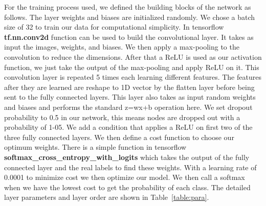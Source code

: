 \documentclass[12pt, a4paper,oneside]{report}
\begin{document}
For the training process used, we defined the building blocks of the network as follows. The layer weights and biases are initialized randomly. We chose a batch size of 32 to train our data for computational simplicity. In tensorflow \textbf{tf.nn.conv2d} function can be used to build the convolutional layer. It takes as input the images, weights, and biases. We then apply a max-pooling to the convolution to reduce the dimensions. After that a ReLU is used as our activation function, we just take the output of the max-pooling and apply ReLU on it. This convolution layer is repeated 5 times each learning different features. The features after they are learned are reshape to 1D vector by the flatten layer before being sent to the fully connected layers. This layer also takes as input random weights and biases and performs the standard z=wx+b operation here. We set dropout probability to 0.5 in our network, this means nodes are dropped out with a probability of 1-05. We add a condition that applies a ReLU on first two of the three fully connected layers. We then define a cost function to choose our optimum weights. There is a simple function in tensorflow \textbf{softmax\_cross\_entropy\_with\_logits} which takes the output of the fully connected layer and the real labels to find these weights. With a learning rate of 0.0001 to minimize cost we then optimize our model. We then call a softmax when we have the lowest cost to get the probability of each class. The detailed layer parameters and layer order are shown in Table~\ref{table:para}. 
\end{document}
